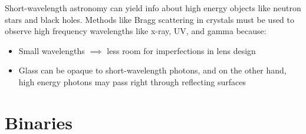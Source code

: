 \documentclass[12pt]{article}
\begin{document}
Short-wavelength astronomy can yield info about high energy objects like neutron stars and black holes. Methods like Bragg scattering in crystals must be used to observe high frequency wavelengths like x-ray, UV, and gamma because:
\begin{itemize}
    \item Small wavelengths $\implies$ less room for imperfections in lens design
    \item Glass can be opaque to short-wavelength photons, and on the other hand, high energy photons may pass right through reflecting surfaces
\end{itemize}

\section{Binaries}
\end{document}
